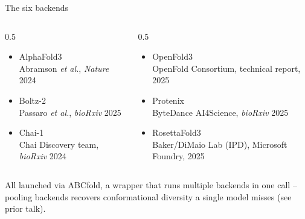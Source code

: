 \documentclass[aspectratio=169]{beamer}
\begin{document}
\begin{frame}{The six backends}
  \begin{columns}[T]
    \begin{column}{0.5\textwidth}
      \begin{itemize}
        \setlength{\itemsep}{0.6em}
        \item AlphaFold3\\
          {\fontsize{6pt}{7pt}\selectfont\color{muted}Abramson \textit{et al.}, \textit{Nature} 2024}
        \item Boltz-2\\
          {\fontsize{6pt}{7pt}\selectfont\color{muted}Passaro \textit{et al.}, \textit{bioRxiv} 2025}
        \item Chai-1\\
          {\fontsize{6pt}{7pt}\selectfont\color{muted}Chai Discovery team, \textit{bioRxiv} 2024}
      \end{itemize}
    \end{column}
    \begin{column}{0.5\textwidth}
      \begin{itemize}
        \setlength{\itemsep}{0.6em}
        \item OpenFold3\\
          {\fontsize{6pt}{7pt}\selectfont\color{muted}OpenFold Consortium, technical report, 2025}
        \item Protenix\\
          {\fontsize{6pt}{7pt}\selectfont\color{muted}ByteDance AI4Science, \textit{bioRxiv} 2025}
        \item RosettaFold3\\
          {\fontsize{6pt}{7pt}\selectfont\color{muted}Baker/DiMaio Lab (IPD), Microsoft Foundry, 2025}
      \end{itemize}
    \end{column}
  \end{columns}
  \vspace{0.6em}
  \centering
  All launched via ABCfold, a wrapper that runs multiple backends in one
  call -- pooling backends recovers conformational diversity a single model
  misses (see prior talk).
\end{frame}
\end{document}

